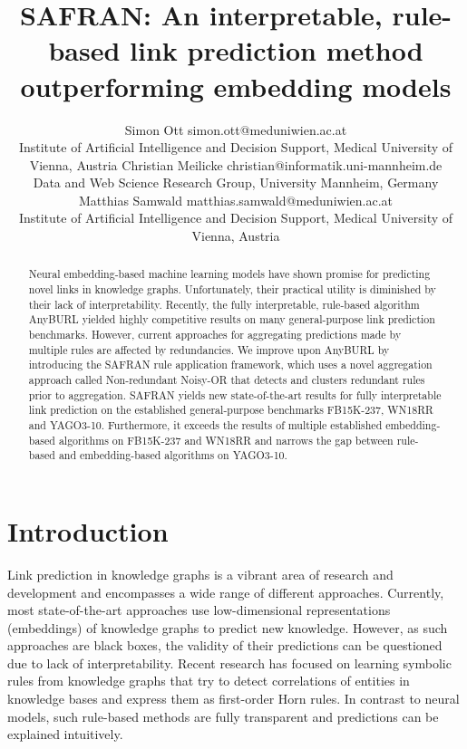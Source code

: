 \documentclass[akbc,twoside,11pt,lettersize]{article}
\begin{document}
\title{SAFRAN: An interpretable, rule-based link prediction method outperforming embedding models}

\author{\name Simon Ott \email simon.ott@meduniwien.ac.at \\
       \addr Institute of Artificial Intelligence and Decision Support, Medical University of Vienna, Austria 
       \AND
       \name Christian Meilicke \email christian@informatik.uni-mannheim.de \\
       \addr  Data and Web Science Research Group, University Mannheim, Germany
       \AND
       \name Matthias Samwald \email matthias.samwald@meduniwien.ac.at \\
       \addr Institute of Artificial Intelligence and Decision Support, Medical University of Vienna, Austria 
       }



\maketitle


\begin{abstract}
Neural embedding-based machine learning models have shown promise for predicting novel links in knowledge graphs. Unfortunately, their practical utility is diminished by their lack of interpretability. Recently, the fully interpretable, rule-based algorithm AnyBURL yielded highly competitive results on many general-purpose link prediction benchmarks. However, current approaches for aggregating predictions made by multiple rules are affected by redundancies. We improve upon AnyBURL by introducing the SAFRAN rule application framework, which uses a novel aggregation approach called Non-redundant Noisy-OR that detects and clusters redundant rules prior to aggregation. SAFRAN yields new state-of-the-art results for fully interpretable link prediction on the established general-purpose benchmarks FB15K-237, WN18RR and YAGO3-10. Furthermore, it exceeds the results of multiple established embedding-based algorithms on FB15K-237 and WN18RR and narrows the gap between rule-based and embedding-based algorithms on YAGO3-10.

\end{abstract}

\section{Introduction}
\label{Introduction}

Link prediction in knowledge graphs is a vibrant area of research and development and encompasses a wide range of different approaches. Currently, most state-of-the-art approaches use low-dimensional representations (embeddings) of knowledge graphs to predict new knowledge. However, as such approaches are black boxes, the validity of their predictions can be questioned due to lack of interpretability. Recent research has focused on learning symbolic rules from knowledge graphs that try to detect correlations of entities in knowledge bases and express them as first-order Horn rules. In contrast to neural models, such rule-based methods are fully transparent and predictions can be explained intuitively.
\end{document}
